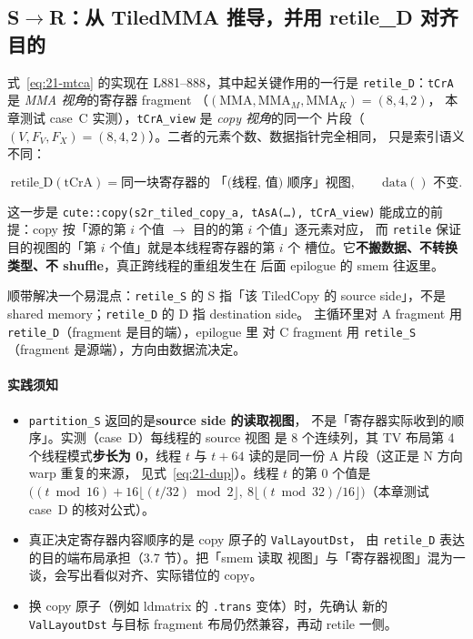 \subsection{S$\to$R：从 TiledMMA 推导，并用 retile\_D 对齐目的}

\begin{sloppypar}
式~\eqref{eq:21-mtca} 的实现在 L881--888，其中起关键作用的一行是
\texttt{retile\_D}：\texttt{tCrA} 是 \emph{MMA 视角}的寄存器 fragment
（$(\mathrm{MMA}, \mathrm{MMA}_M, \mathrm{MMA}_K) = (8,4,2)$，
本章测试 case~C 实测），\texttt{tCrA\_view} 是 \emph{copy 视角}的同一个
片段（$(V, F_V, F_X) = (8,4,2)$）。二者的元素个数、数据指针完全相同，
只是索引语义不同：
\end{sloppypar}

\begin{equation}
  \mathrm{retile\_D}(\mathrm{tCrA}) = \text{同一块寄存器的
  「(线程, 值) 顺序」视图},\qquad \mathrm{data()} \text{ 不变} .
  \label{eq:21-retile-d}
\end{equation}

这一步是 \texttt{cute::\allowbreak{}copy\allowbreak{}(s2r\_\allowbreak{}tiled\_\allowbreak{}copy\_\allowbreak{}a,\allowbreak{} tAsA\allowbreak{}(\dots),\allowbreak{} tCrA\_\allowbreak{}view)}
能成立的前提：copy 按「源的第 $i$ 个值 $\to$ 目的的第 $i$ 个值」逐元素对应，
而 \texttt{retile} 保证目的视图的「第 $i$ 个值」就是本线程寄存器的第 $i$ 个
槽位。它\textbf{不搬数据、不转换类型、不 shuffle}，真正跨线程的重组发生在
后面 epilogue 的 smem 往返里。

顺带解决一个易混点：\texttt{retile\_S} 的 S 指「该 TiledCopy 的 source
side」，不是 shared memory；\texttt{retile\_D} 的 D 指 destination side。
主循环里对 A fragment 用 \texttt{retile\_D}（fragment 是目的端），epilogue 里
对 C fragment 用 \texttt{retile\_S}（fragment 是源端），方向由数据流决定。

\paragraph{实践须知}
\begin{itemize}
  \item \texttt{partition\_S} 返回的是\textbf{source side 的读取视图}，
        不是「寄存器实际收到的顺序」。实测（case~D）每线程的 source 视图
        是 8 个连续列，其 TV 布局第 4 个线程模式\textbf{步长为 0}，线程
        $t$ 与 $t+64$ 读的是同一份 A 片段（这正是 N 方向 warp 重复的来源，
        见式~\eqref{eq:21-dup}）。线程 $t$ 的第 0 个值是
        $\bigl((t\bmod 16) + 16\lfloor (t/32)\bmod 2\rfloor,\
        8\lfloor (t\bmod 32)/16\rfloor\bigr)$（本章测试 case~D 的核对公式）。
  \item 真正决定寄存器内容顺序的是 copy 原子的 \texttt{Val\allowbreak{}Layout\allowbreak{}Dst}，
        由 \texttt{retile\_D} 表达的目的端布局承担（3.7 节）。把「smem 读取
        视图」与「寄存器视图」混为一谈，会写出看似对齐、实际错位的 copy。
  \item 换 copy 原子（例如 ldmatrix 的 \texttt{.trans} 变体）时，先确认
        新的 \texttt{Val\allowbreak{}Layout\allowbreak{}Dst} 与目标 fragment 布局仍然兼容，再动
        retile 一侧。
\end{itemize}


